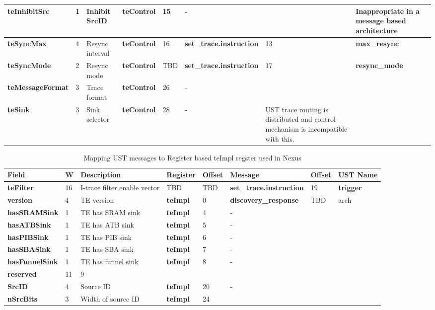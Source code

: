 \begin{table}[htp]
\begin{tabulary}{\textwidth}{|l|l|p{15mm}|l|p{10mm}|l|p{15mm}|p{15mm}}
    \textbf{teInhibitSrc} & 1 & Inhibit SrcID & \textbf{teControl} & 15 & - & &  Inappropriate in a message based architecture \\
    \hline
    \textbf{teSyncMax} & 4 & Resync interval & \textbf{teControl} & 16 & \textbf{set\_trace.instruction} & 13 & \textbf{max\_resync}\\
    \hline
    \textbf{teSyncMode} & 2 &Resync mode & \textbf{teControl} & TBD & \textbf{set\_trace.instruction} & 17 & \textbf{resync\_mode} \\
    \hline
    \textbf{teMessageFormat} & 3 & Trace format & \textbf{teControl} & 26 & - & & \\
    \hline
    \textbf{teSink} & 3 & Sink selector & \textbf{teControl} & 28 & - & UST trace routing is distributed and control mechanism is incompatible with this.\\
    \hline
  \end{tabulary}
\end{table}



\begin{table}[htp]
  \tiny
  \centering
  \caption{Mapping UST messages to Register based teImpl regster used in Nexus}
  \label{tab:te_control}
  \begin{tabulary}{\textwidth}{|l|l|p{15mm}|l|p{10mm}|l|p{15mm}|p{15mm}}
    \hline
    {\bf Field} & {\bf W} & {\bf Description} & {\bf Register} & {\bf Offset} & {\bf Message} & {\bf Offset} & {\bf UST Name} \\
    \hline
    \textbf{teFilter} & 16 & I-trace filter enable vector & TBD & TBD & \textbf{set\_trace.instruction} & 19 & \textbf{trigger} \\
    \hline
    \textbf{version} & 4 & TE version & \textbf{teImpl} & 0 & \textbf{discovery\_response} & TBD & arch \\
    \hline
    \textbf{hasSRAMSink} & 1 & TE has SRAM sink & \textbf{teImpl} & 4 & - & \\
    \hline
    \textbf{hasATBSink} & 1 & TE has ATB sink & \textbf{teImpl} & 5 & - &\\
    \hline
    \textbf{hasPIBSink} & 1 & TE has PIB sink & \textbf{teImpl} & 6 & - &\\
    \hline
    \textbf{hasSBASink} & 1 & TE has SBA sink & \textbf{teImpl} & 7 & - & &\\
    \hline
    \textbf{hasFunnelSink} & 1 & TE has funnel sink & \textbf{teImpl} & 8 & - &\\
    \hline
    \textbf{reserved} & 11 & 9 & & & & &\\
    \hline
    \textbf{SrcID} & 4 & Source ID & \textbf{teImpl} & 20 & - &\\
    \hline
    \textbf{nSrcBits} & 3 & Width of source ID & \textbf{teImpl} & 24 & & &\\
    \hline
  \end{tabulary}
\end{table}

